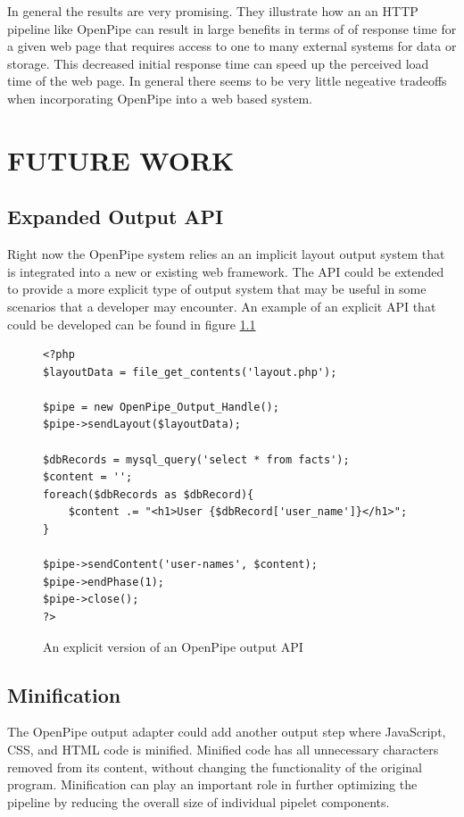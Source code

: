 \documentclass[12pt]{report}
\begin{document}
In general the results are very promising.  They illustrate how an an HTTP pipeline like OpenPipe can result in large benefits in terms of of response time for a given web page that requires access to one to many external systems for data or storage. This decreased initial response time can speed up the perceived load time of the web page. In general there seems to be very little negeative tradeoffs when incorporating OpenPipe into a web based system.

\chapter{FUTURE WORK}

\section{Expanded Output API}
Right now the OpenPipe system relies an an implicit layout output system that is integrated into a new or existing web framework. The API could be extended to provide a more explicit type of output system that may be useful in some scenarios that a developer may encounter. An example of an explicit API that could  be developed can be found in figure \ref{fig:explicitApi}

\begin{figure}[H]
\label{fig:explicitApi}
\begin{lstlisting}
<?php
$layoutData = file_get_contents('layout.php');

$pipe = new OpenPipe_Output_Handle();
$pipe->sendLayout($layoutData);

$dbRecords = mysql_query('select * from facts');
$content = '';
foreach($dbRecords as $dbRecord){
	$content .= "<h1>User {$dbRecord['user_name']}</h1>";
}

$pipe->sendContent('user-names', $content);
$pipe->endPhase(1);
$pipe->close();
?>
\end{lstlisting}
\caption{An explicit version of an OpenPipe output API}
\end{figure}

\section{Minification}
The OpenPipe output adapter could add another output step where JavaScript, CSS, and HTML code is minified. Minified code has all unnecessary characters removed from its content, without changing the functionality of the original program. Minification can play an important role in further optimizing the pipeline by reducing the overall size of individual pipelet components.
\end{document}

